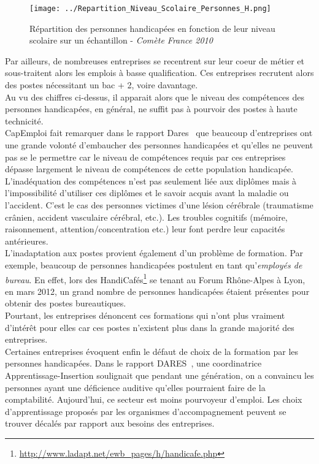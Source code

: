 \begin{figure}[H]
\centering
\texttt{[image: ../Repartition\_Niveau\_Scolaire\_Personnes\_H.png]}
\caption{Répartition des personnes handicapées en fonction de leur niveau scolaire sur un échantillon - \textit{Comète France 2010}}
\end{figure}

Par ailleurs, de nombreuses entreprises se recentrent sur leur coeur de métier et sous-traitent alors les emplois à basse qualification. Ces entreprises recrutent alors des postes nécessitant un bac + 2, voire davantage.\\

Au vu des chiffres ci-dessus, il apparait alors que le niveau des compétences des personnes handicapées, en général, ne suffit pas à pourvoir des postes à haute technicité.\\
CapEmploi fait remarquer dans le rapport Dares~\cite{etudeDares1} que beaucoup d'entreprises ont une grande volonté d'embaucher des personnes handicapées et qu'elles ne peuvent pas se le permettre car le niveau de compétences requis par ces entreprises dépasse largement le niveau de compétences de cette population handicapée.\\

L'inadéquation des compétences n'est pas seulement liée aux diplômes mais à l'impossibilité d'utiliser ces diplômes et le savoir acquis avant la maladie ou l'accident. C'est le cas des personnes victimes d'une lésion cérébrale (traumatisme crânien, accident vasculaire cérébral, etc.). Les troubles cognitifs (mémoire, raisonnement, attention/concentration etc.) leur font perdre leur capacités antérieures. \\

L'inadaptation aux postes provient également d'un problème de formation. Par exemple, beaucoup de personnes handicapées postulent en tant qu'\textit{employés de bureau}. En effet, lors des HandiCafés\footnote{\url{http://www.ladapt.net/ewb_pages/h/handicafe.php}} se tenant au Forum Rhône-Alpes à Lyon, en mars 2012, un grand nombre de personnes handicapées étaient présentes pour obtenir des postes bureautiques.\\
Pourtant, les entreprises dénoncent ces formations qui n'ont plus vraiment d'intérêt pour elles car ces postes n'existent plus dans la grande majorité des entreprises.\\

Certaines entreprises évoquent enfin le défaut de choix de la formation par les personnes handicapées.
Dans le rapport DARES~\cite{etudeDares1}, une coordinatrice Apprentissage-Insertion soulignait que pendant une génération, on a convaincu les personnes ayant une déficience auditive qu'elles pourraient faire de la comptabilité. Aujourd'hui, ce secteur est moins pourvoyeur d'emploi. Les choix d'apprentissage proposés par les organismes d'accompagnement peuvent se trouver décalés par rapport aux besoins des entreprises.

